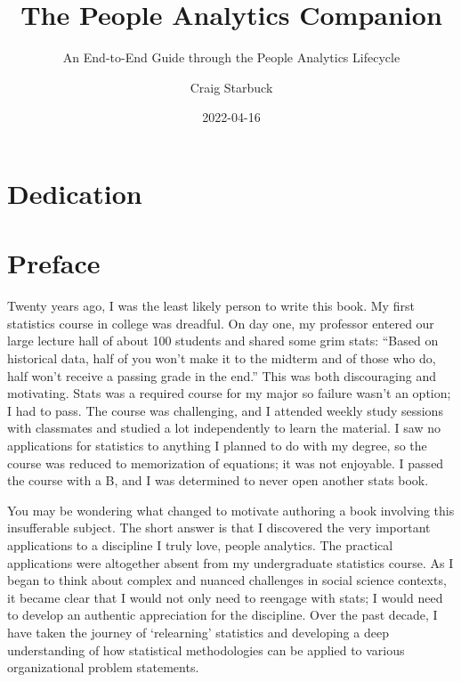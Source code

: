 \documentclass[]{book}
\title{The People Analytics Companion}
\subtitle{An End-to-End Guide through the People Analytics Lifecycle}
\author{Craig Starbuck}
\date{2022-04-16}
\begin{document}
\maketitle

{
\setcounter{tocdepth}{1}
\tableofcontents
}
\hypertarget{dedication}{%
\chapter*{Dedication}\label{dedication}}

\hypertarget{preface}{%
\chapter*{Preface}\label{preface}}

Twenty years ago, I was the least likely person to write this book. My first statistics course in college was dreadful. On day one, my professor entered our large lecture hall of about 100 students and shared some grim stats: ``Based on historical data, half of you won't make it to the midterm and of those who do, half won't receive a passing grade in the end.'' This was both discouraging and motivating. Stats was a required course for my major so failure wasn't an option; I had to pass. The course was challenging, and I attended weekly study sessions with classmates and studied a lot independently to learn the material. I saw no applications for statistics to anything I planned to do with my degree, so the course was reduced to memorization of equations; it was not enjoyable. I passed the course with a B, and I was determined to never open another stats book.

You may be wondering what changed to motivate authoring a book involving this insufferable subject. The short answer is that I discovered the very important applications to a discipline I truly love, people analytics. The practical applications were altogether absent from my undergraduate statistics course. As I began to think about complex and nuanced challenges in social science contexts, it became clear that I would not only need to reengage with stats; I would need to develop an authentic appreciation for the discipline. Over the past decade, I have taken the journey of `relearning' statistics and developing a deep understanding of how statistical methodologies can be applied to various organizational problem statements.
\end{document}
